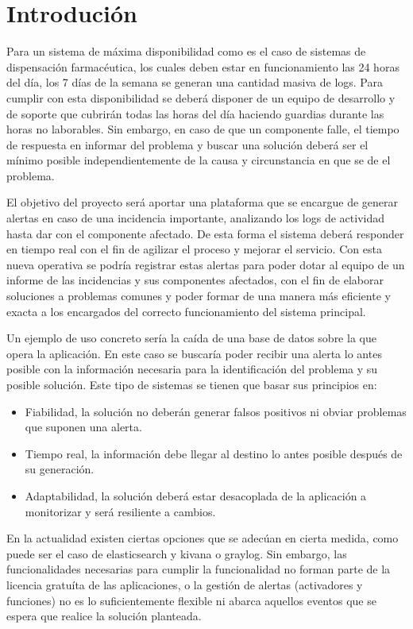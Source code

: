 \chapter{Introdución}

Para un sistema de máxima disponibilidad como es el caso de sistemas de dispensación farmacéutica,
los cuales deben estar en funcionamiento las 24 horas del día, los 7 días de la semana se generan una cantidad masiva de logs. Para cumplir con esta disponibilidad se deberá disponer de un equipo de desarrollo y de soporte que cubrirán todas las horas del día haciendo guardias durante las horas no laborables. Sin embargo, en caso de que un componente falle, el tiempo de respuesta en informar del problema y buscar una solución deberá ser el mínimo posible independientemente de la causa y circunstancia en que se de el problema.

El objetivo del proyecto será aportar una plataforma que se encargue de generar alertas en caso de una incidencia importante, analizando los logs de actividad hasta dar con el componente afectado. De esta forma el sistema deberá responder en tiempo real con el fin de agilizar el proceso y mejorar el servicio. Con esta nueva operativa se podría registrar estas alertas para poder dotar al equipo de un informe de las incidencias y sus componentes afectados, con el fin de elaborar soluciones a problemas comunes y poder formar de una manera más eficiente y exacta a los encargados del correcto funcionamiento del sistema principal. 

Un ejemplo de uso concreto sería la caída de una base de datos sobre la que opera la aplicación. En este caso se buscaría poder recibir una alerta lo antes posible con la información necesaria para la identificación del problema y su posible solución. Este tipo de sistemas se tienen que basar sus principios en:

\begin{itemize}
	\item Fiabilidad, la solución no deberán generar falsos positivos ni obviar problemas que suponen una alerta.
	\item Tiempo real, la información debe llegar al destino lo antes posible después de su generación.
	\item Adaptabilidad, la solución deberá estar desacoplada de la aplicación a monitorizar y será resiliente a cambios.
\end{itemize}

En la actualidad existen ciertas opciones que se adecúan en cierta medida, como puede ser el caso de elasticsearch y kivana o graylog. Sin embargo, las funcionalidades necesarias para cumplir la funcionalidad no forman parte de la licencia gratuíta de las aplicaciones, o la gestión de alertas (activadores y funciones) no es lo suficientemente flexible ni abarca aquellos eventos que se espera que realice la solución planteada.

